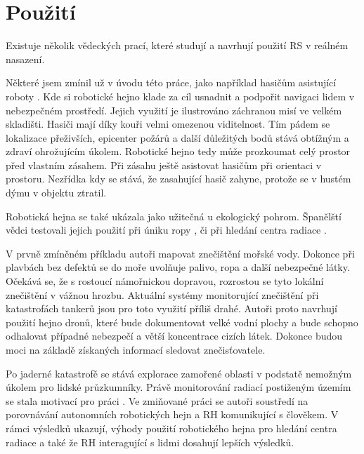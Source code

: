 \section{Použití}
Existuje několik vědeckých prací, které studují a navrhují použití RS v reálném nasazení. 
\par 
Některé jsem zmínil už v úvodu této práce, jako například hasičům asistující roboty \citep{fireRobots}.  Kde si robotické hejno klade za cíl usnadnit a podpořit navigaci lidem v nebezpečném prostředí. Jejich využití je ilustrováno záchranou misí ve velkém skladišti. Hasiči mají díky kouři velmi omezenou viditelnost. Tím pádem se lokalizace přeživších, epicenter požárů a další důležitých bodů stává obtížným a zdraví ohrožujícím úkolem. Robotické hejno tedy může prozkoumat celý prostor před vlastním zásahem. Při zásahu ještě asistovat hasičům při orientaci v prostoru. Nezřídka kdy se stává, že zasahující hasič zahyne, protože se v hustém dýmu v objektu ztratil.
\par
Robotická hejna se také ukázala jako užitečná u ekologický pohrom. Španělští vědci testovali jejich použití při úniku ropy \citep{oilSwarm}, či při hledání centra radiace \citep{radiationSwarm}. 
\par 
V prvně zmíněném příkladu autoři mapovat znečištění mořské vody. Dokonce při plavbách bez defektů se do moře uvolňuje palivo, ropa a další nebezpečné látky. Očekává se, že s rostoucí námořnickou dopravou, rozrostou se tyto lokální znečištění v vážnou hrozbu. Aktuální systémy monitorující znečištění při katastrofách tankerů jsou pro toto využití příliš drahé. Autoři proto navrhují použití hejno dronů, které bude dokumentovat velké vodní plochy a bude schopno odhalovat případné nebezpečí a větší koncentrace cizích látek. Dokonce budou moci na základě získaných informací sledovat znečisťovatele. 
\par
Po jaderné katastrofě se stává explorace zamořené oblasti  v podstatě nemožným úkolem pro lidské průzkumníky. Právě monitorování radiací postiženým územím se stala motivací pro práci \citep{radiationSwarm}. Ve zmiňované práci se autoři soustředí na porovnávání autonomních robotických hejn a RH komunikující s člověkem. V rámci výsledků ukazují, výhody použití robotického hejna pro hledání centra radiace a také že RH interagující s lidmi dosahují lepších výsledků.
\par
